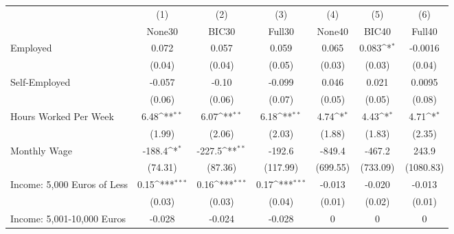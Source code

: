 {
\def\sym#1{\ifmmode^{#1}\else\(^{#1}\)\fi}
\begin{tabular}{l*{6}{c}}
\toprule
            &\multicolumn{1}{c}{(1)}&\multicolumn{1}{c}{(2)}&\multicolumn{1}{c}{(3)}&\multicolumn{1}{c}{(4)}&\multicolumn{1}{c}{(5)}&\multicolumn{1}{c}{(6)}\\
            &\multicolumn{1}{c}{None30}&\multicolumn{1}{c}{BIC30}&\multicolumn{1}{c}{Full30}&\multicolumn{1}{c}{None40}&\multicolumn{1}{c}{BIC40}&\multicolumn{1}{c}{Full40}\\
\midrule
Employed    &       0.072         &       0.057         &       0.059         &       0.065         &       0.083\sym{*}  &     -0.0016         \\
            &      (0.04)         &      (0.04)         &      (0.05)         &      (0.03)         &      (0.03)         &      (0.04)         \\
\addlinespace
Self-Employed&      -0.057         &       -0.10         &      -0.099         &       0.046         &       0.021         &      0.0095         \\
            &      (0.06)         &      (0.06)         &      (0.07)         &      (0.05)         &      (0.05)         &      (0.08)         \\
\addlinespace
Hours Worked Per Week&        6.48\sym{**} &        6.07\sym{**} &        6.18\sym{**} &        4.74\sym{*}  &        4.43\sym{*}  &        4.71\sym{*}  \\
            &      (1.99)         &      (2.06)         &      (2.03)         &      (1.88)         &      (1.83)         &      (2.35)         \\
\addlinespace
Monthly Wage&      -188.4\sym{*}  &      -227.5\sym{**} &      -192.6         &      -849.4         &      -467.2         &       243.9         \\
            &     (74.31)         &     (87.36)         &    (117.99)         &    (699.55)         &    (733.09)         &   (1080.83)         \\
\addlinespace
Income: 5,000 Euros of Less&        0.15\sym{***}&        0.16\sym{***}&        0.17\sym{***}&      -0.013         &      -0.020         &      -0.013         \\
            &      (0.03)         &      (0.03)         &      (0.04)         &      (0.01)         &      (0.02)         &      (0.01)         \\
\addlinespace
Income: 5,001-10,000 Euros&      -0.028         &      -0.024         &      -0.028         &           0         &           0         &           0         \\

\end{tabular}}
